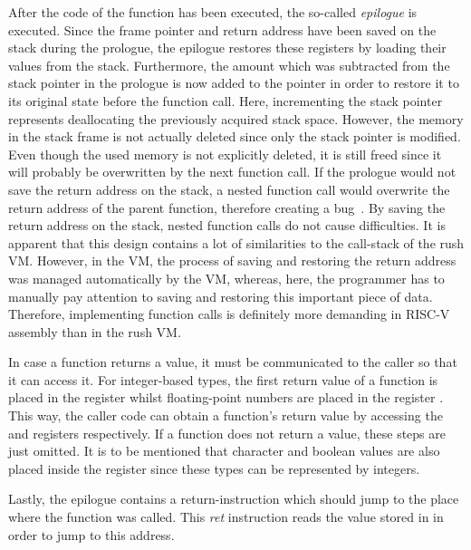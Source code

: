 After the code of the function has been executed, the so-called \emph{epilogue} is executed.
Since the frame pointer and return address have been saved on the stack during the prologue,
the epilogue restores these registers by loading their values from the stack.
Furthermore, the amount which was subtracted from the stack pointer in the prologue is now added to the pointer in order to restore it to its original state before the function call.
Here, incrementing the stack pointer represents deallocating the previously acquired stack space.
However, the memory in the stack frame is not actually deleted since only the stack pointer is modified.
Even though the used memory is not explicitly deleted, it is still freed since it will probably be overwritten by the next function call.
If the prologue would not save the return address on the stack, a nested function call would overwrite the return address of the parent function, therefore creating a bug~\cite[p.33]{Patterson2017}.
By saving the return address on the stack, nested function calls do not cause difficulties.
It is apparent that this design contains a lot of similarities to the call-stack of the rush VM\@.
However, in the VM, the process of saving and restoring the return address was managed automatically by the VM,
whereas, here, the programmer has to manually pay attention to saving and restoring this important piece of data.
Therefore, implementing function calls is definitely more demanding in RISC-V assembly than in the rush VM\@.

In case a function returns a value, it must be communicated to the caller so that it can access it.
For integer-based types, the first return value of a function is placed in the register 
whilst floating-point numbers are placed in the register .
This way, the caller code can obtain a function's return value by accessing the  and 
registers respectively. If a function does not return a value, these steps are just omitted.
It is to be mentioned that character and boolean values are also placed inside the  register since these types can be represented by integers.

Lastly, the epilogue contains a return-instruction which should jump to the place where the function was called.
This \emph{ret} instruction reads the value stored in  in order to jump to this address.



